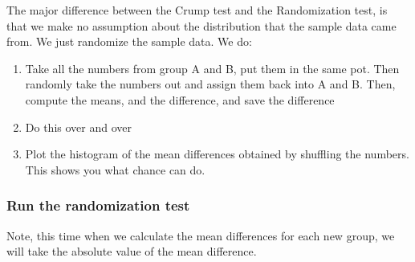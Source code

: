 \documentclass[
]{book}
\providecommand{\tightlist}{%
  \setlength{\itemsep}{0pt}\setlength{\parskip}{0pt}}
\begin{document}
The major difference between the Crump test and the Randomization test, is that we make no assumption about the distribution that the sample data came from. We just randomize the sample data. We do:

\begin{enumerate}
\def\labelenumi{\arabic{enumi}.}
\tightlist
\item
  Take all the numbers from group A and B, put them in the same pot. Then randomly take the numbers out and assign them back into A and B. Then, compute the means, and the difference, and save the difference
\item
  Do this over and over
\item
  Plot the histogram of the mean differences obtained by shuffling the numbers. This shows you what chance can do.
\end{enumerate}

\hypertarget{run-the-randomization-test}{%
\subsubsection{Run the randomization test}\label{run-the-randomization-test}}

Note, this time when we calculate the mean differences for each new group, we will take the absolute value of the mean difference.
\end{document}
